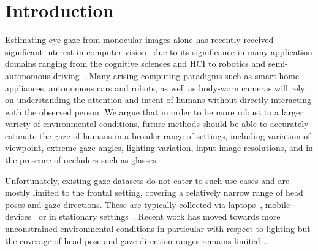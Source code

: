 \documentclass[runningheads]{llncs}
\begin{document}
\section{Introduction}
Estimating eye-gaze from monocular images alone has recently received significant interest in computer vision~\cite{wang2019generalizing,yu2019improving,fischer2018rt} due to its significance in many application domains ranging from the cognitive sciences and HCI to robotics and semi-autonomous driving~\cite{demiris2007prediction,majaranta2014eye,park2013predicting}. 
Many arising computing paradigms such as smart-home appliances, autonomous cars and robots, as well as body-worn cameras will rely on understanding the attention and intent of humans without directly interacting with the observed person.
We argue that in order  
to be more robust to a larger variety of environmental conditions, future methods should be able to accurately estimate the gaze of humans in a broader range of settings, including variation of viewpoint, extreme gaze angles, lighting variation, input image resolutions, and in the presence of occluders such as glasses. 

Unfortunately, existing gaze datasets do not cater to such use-cases and are mostly limited to the frontal setting, covering a relatively narrow range of head poses and gaze directions. These are typically collected via laptops~\cite{zhang2019mpiigaze}, mobile devices~\cite{krafka2016eye,huang2017tabletgaze} or in stationary settings~\cite{funes2014eyediap}. Recent work has moved towards more unconstrained environmental conditions in particular with respect to lighting but the coverage of head pose and gaze direction ranges remains limited~\cite{kellnhofer2019gaze360,fischer2018rt,yu2020humbi}.
\end{document}
